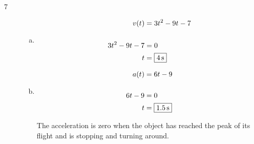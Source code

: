\documentclass[letterpaper, landscape]{exam}
\begin{document}
  \begin{description}







    \item[7]
      \begin{enumerate}[(a)]
        \item 
          \begin{align*}
            v(t)          & = 3t^2 - 9t - 7 \\
            \\
            3t^2 - 9t - 7 & = 0 \\
            t             & = \boxed{ \unit[4]{s} } \\
          \end{align*}

        \item
          \begin{align*}
            a(t)   & = 6t - 9 \\
            \\
            6t - 9 & = 0 \\
            t      & = \boxed{ \unit[1.5]{s} } \\
          \end{align*}

          The acceleration is zero when the object has reached the peak of its flight and is
          stopping and turning around.


\end{enumerate}
\end{description}
\end{document}
